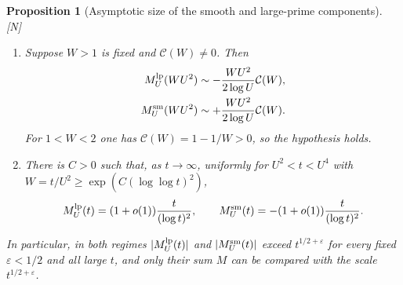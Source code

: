\documentclass[11pt,reqno]{amsart}
\numberwithin{equation}{section}
\theoremstyle{plain}
\newtheorem{proposition}[theorem]{Proposition}
\theoremstyle{definition}
\theoremstyle{remark}
\newcommand{\eps}{\varepsilon}
\newcommand{\Cc}{\mathcal{C}}
\newcommand{\tagN}{\textup{[N]}}
\begin{document}
\begin{proposition}[Asymptotic size of the smooth and large-prime components]
\label{prop:both_parts_large}
\tagN\ \begin{enumerate}[label=\textup{(\roman*)},leftmargin=*]
\item Suppose $W>1$ is fixed and $\Cc(W)\ne0$. Then
\begin{align}
\label{eq:E_fixed_W_size}
  M^{\rm lp}_U(WU^2)&\sim-\frac{WU^2}{2\log U}\Cc(W),\\
  M^{\rm sm}_U(WU^2)&\sim+\frac{WU^2}{2\log U}\Cc(W).
\end{align}
For $1<W<2$ one has $\Cc(W)=1-1/W>0$, so the hypothesis holds.
\item There is $C>0$ such that, as $t\to\infty$, uniformly for $U^2<t<U^4$
with $W=t/U^2\ge\exp(C(\log\log t)^2)$,
\begin{equation}
\label{eq:E_log2}
  M^{\rm lp}_U(t)=(1+o(1))\frac{t}{(\log t)^2},\qquad
  M^{\rm sm}_U(t)=-(1+o(1))\frac{t}{(\log t)^2}.
\end{equation}
\end{enumerate}
In particular, in both regimes $|M^{\rm lp}_U(t)|$ and $|M^{\rm sm}_U(t)|$ exceed
$t^{1/2+\eps}$ for every fixed $\eps<1/2$ and all large $t$, and only their
sum $M$ can be compared with the scale $t^{1/2+\eps}$.
\end{proposition}
\end{document}
